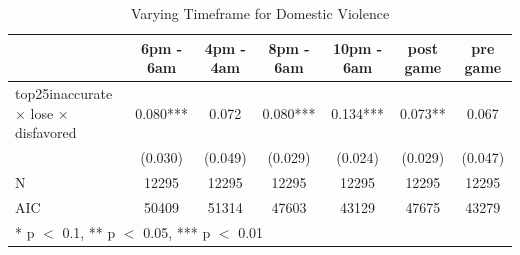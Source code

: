 \begin{table}
\centering
\caption{Varying Timeframe for Domestic Violence}
\centering
\begin{tabular}[t]{lcccccc}
\toprule
  & 6pm - 6am & 4pm - 4am & 8pm - 6am & 10pm - 6am & post game & pre game\\
\midrule
top25inaccurate × lose × disfavored & \num{0.080}*** & \num{0.072} & \num{0.080}*** & \num{0.134}*** & \num{0.073}** & \num{0.067}\\
 & (\num{0.030}) & (\num{0.049}) & (\num{0.029}) & (\num{0.024}) & (\num{0.029}) & (\num{0.047})\\
\midrule
N & \num{12295} & \num{12295} & \num{12295} & \num{12295} & \num{12295} & \num{12295}\\
AIC & \num{50409} & \num{51314} & \num{47603} & \num{43129} & \num{47675} & \num{43279}\\
\bottomrule
\multicolumn{7}{l}{\rule{0pt}{1em}* p $<$ 0.1, ** p $<$ 0.05, *** p $<$ 0.01}\\
\end{tabular}
\end{table}
